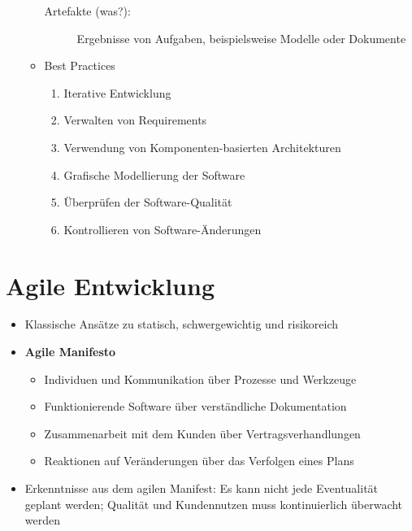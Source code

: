 \begin{itemize}
\begin{itemize}
\begin{description}
			\item[Artefakte (was?):] Ergebnisse von Aufgaben, beispielsweise Modelle oder Dokumente 
		\end{description}
		\item Best Practices
		\begin{enumerate}
			\item Iterative Entwicklung
			\item Verwalten von Requirements
			\item Verwendung von Komponenten-basierten Architekturen
			\item Grafische Modellierung der Software
			\item Überprüfen der Software-Qualität
			\item Kontrollieren von Software-Änderungen
		\end{enumerate}
	\end{itemize}
\end{itemize}



\section{Agile Entwicklung}
\begin{itemize}
	\item Klassische Ansätze zu statisch, schwergewichtig und risikoreich
	\item \textbf{Agile Manifesto}
	\begin{itemize}
		\item Individuen und Kommunikation über Prozesse und Werkzeuge
		\item Funktionierende Software über verständliche Dokumentation
		\item Zusammenarbeit mit dem Kunden über Vertragsverhandlungen
		\item Reaktionen auf Veränderungen über das Verfolgen eines Plans
	\end{itemize}
	\item Erkenntnisse aus dem agilen Manifest: Es kann nicht jede Eventualität geplant werden; Qualität und Kundennutzen muss kontinuierlich überwacht werden
\end{itemize}

